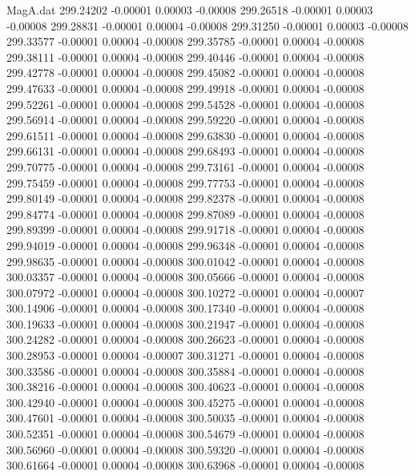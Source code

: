 \begin{filecontents}{MagA.dat}
 299.24202   -0.00001    0.00003   -0.00008
 299.26518   -0.00001    0.00003   -0.00008
 299.28831   -0.00001    0.00004   -0.00008
 299.31250   -0.00001    0.00003   -0.00008
 299.33577   -0.00001    0.00004   -0.00008
 299.35785   -0.00001    0.00004   -0.00008
 299.38111   -0.00001    0.00004   -0.00008
 299.40446   -0.00001    0.00004   -0.00008
 299.42778   -0.00001    0.00004   -0.00008
 299.45082   -0.00001    0.00004   -0.00008
 299.47633   -0.00001    0.00004   -0.00008
 299.49918   -0.00001    0.00004   -0.00008
 299.52261   -0.00001    0.00004   -0.00008
 299.54528   -0.00001    0.00004   -0.00008
 299.56914   -0.00001    0.00004   -0.00008
 299.59220   -0.00001    0.00004   -0.00008
 299.61511   -0.00001    0.00004   -0.00008
 299.63830   -0.00001    0.00004   -0.00008
 299.66131   -0.00001    0.00004   -0.00008
 299.68493   -0.00001    0.00004   -0.00008
 299.70775   -0.00001    0.00004   -0.00008
 299.73161   -0.00001    0.00004   -0.00008
 299.75459   -0.00001    0.00004   -0.00008
 299.77753   -0.00001    0.00004   -0.00008
 299.80149   -0.00001    0.00004   -0.00008
 299.82378   -0.00001    0.00004   -0.00008
 299.84774   -0.00001    0.00004   -0.00008
 299.87089   -0.00001    0.00004   -0.00008
 299.89399   -0.00001    0.00004   -0.00008
 299.91718   -0.00001    0.00004   -0.00008
 299.94019   -0.00001    0.00004   -0.00008
 299.96348   -0.00001    0.00004   -0.00008
 299.98635   -0.00001    0.00004   -0.00008
 300.01042   -0.00001    0.00004   -0.00008
 300.03357   -0.00001    0.00004   -0.00008
 300.05666   -0.00001    0.00004   -0.00008
 300.07972   -0.00001    0.00004   -0.00008
 300.10272   -0.00001    0.00004   -0.00007
 300.14906   -0.00001    0.00004   -0.00008
 300.17340   -0.00001    0.00004   -0.00008
 300.19633   -0.00001    0.00004   -0.00008
 300.21947   -0.00001    0.00004   -0.00008
 300.24282   -0.00001    0.00004   -0.00008
 300.26623   -0.00001    0.00004   -0.00008
 300.28953   -0.00001    0.00004   -0.00007
 300.31271   -0.00001    0.00004   -0.00008
 300.33586   -0.00001    0.00004   -0.00008
 300.35884   -0.00001    0.00004   -0.00008
 300.38216   -0.00001    0.00004   -0.00008
 300.40623   -0.00001    0.00004   -0.00008
 300.42940   -0.00001    0.00004   -0.00008
 300.45275   -0.00001    0.00004   -0.00008
 300.47601   -0.00001    0.00004   -0.00008
 300.50035   -0.00001    0.00004   -0.00008
 300.52351   -0.00001    0.00004   -0.00008
 300.54679   -0.00001    0.00004   -0.00008
 300.56960   -0.00001    0.00004   -0.00008
 300.59320   -0.00001    0.00004   -0.00008
 300.61664   -0.00001    0.00004   -0.00008
 300.63968   -0.00001    0.00004   -0.00008

\end{filecontents}
